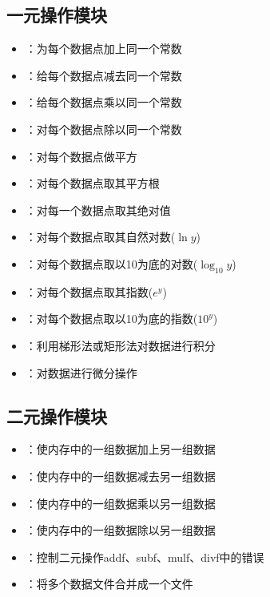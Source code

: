 \subsection*{一元操作模块}
\begin{itemize}
\item {}：为每个数据点加上同一个常数
\item {}：给每个数据点减去同一个常数
\item {}：给每个数据点乘以同一个常数
\item {}：对每个数据点除以同一个常数
\item {}：对每个数据点做平方
\item {}：对每个数据点取其平方根
\item {}：对每一个数据点取其绝对值
\item {}：对每个数据点取其自然对数($\ln y$)
\item {}：对每个数据点取以10为底的对数($\log_{10} y$)
\item {}：对每个数据点取其指数($e^y$)
\item {}：对每个数据点取以10为底的指数($10^y$)
\item {}：利用梯形法或矩形法对数据进行积分
\item {}：对数据进行微分操作
\end{itemize}

\subsection*{二元操作模块}
\begin{itemize}
\item {}：使内存中的一组数据加上另一组数据
\item {}：使内存中的一组数据减去另一组数据
\item {}：使内存中的一组数据乘以另一组数据
\item {}：使内存中的一组数据除以另一组数据
\item {}：控制二元操作addf、subf、mulf、divf中的错误
\item {}：将多个数据文件合并成一个文件
\end{itemize}

